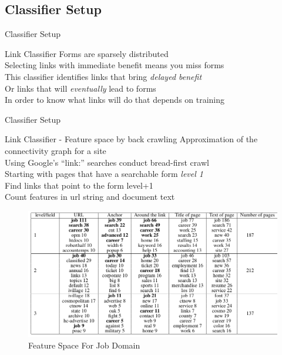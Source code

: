 \documentclass{beamer}
\begin{document}
\subsection{Classifier Setup}
\begin{frame}{Classifier Setup}
\begin{block}{Link Classifier}
Forms are sparsely distributed \\
Selecting links with immediate benefit means you miss forms \\
This classifier identifies links that bring \emph{delayed benefit} \\
Or links that will \emph{eventually} lead to forms \\
In order to know what links will do that depends on training \\
\end{block}
\end{frame}
\begin{frame}{Classifier Setup}
\begin{block}{Link Classifier - Feature space by back crawling}
Approximation of the connectivity graph for a site \\
Using Google's ``link:'' searches conduct bread-first crawl \\
Starting with pages that have a searchable form \emph{level 1} \\
Find links that point to the form level+1 \\
Count features in url string and document text \\
\end{block}
\begin{figure}
			\includegraphics[scale=0.23]{lfs.png}
			\caption{\footnotesize{Feature Space For Job Domain}}
		\end{figure}
\end{frame}
\end{document}
